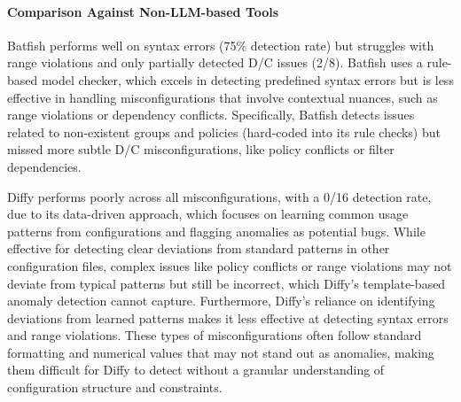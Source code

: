 


\paragraph{Comparison Against Non-LLM-based Tools} Batfish performs well on
syntax errors (75\% detection rate) but struggles with range violations and
only partially detected D/C issues (2/8).  Batfish uses a rule-based model
checker, which excels in detecting predefined syntax errors but is less
effective in handling misconfigurations that involve contextual nuances, such
as range violations or dependency conflicts. Specifically, Batfish 
detects issues related to non-existent groups and policies (hard-coded into its
rule checks) but missed more subtle D/C misconfigurations, like policy
conflicts or filter dependencies.

Diffy performs poorly across all misconfigurations, with a 0/16 detection rate, due to its data-driven approach, which focuses on learning common usage patterns from configurations and flagging anomalies as potential bugs. While effective for detecting clear deviations from standard patterns in other configuration files,
complex issues like policy conflicts or range violations may not deviate from typical patterns but still be incorrect, which Diffy’s template-based anomaly detection cannot capture. Furthermore, Diffy's reliance on identifying deviations from learned patterns makes it less effective at detecting syntax errors and range violations. These types of misconfigurations often follow standard formatting and numerical values that may not stand out as anomalies, making them difficult for Diffy to detect without a granular understanding of configuration structure and constraints.


